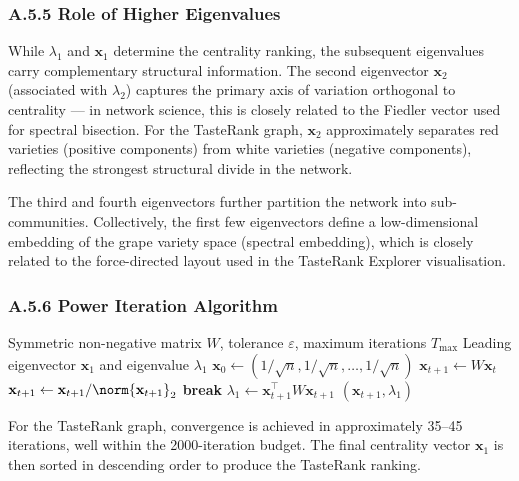 \documentclass[11pt]{article}
\begin{document}
\subsubsection*{A.5.5 Role of Higher Eigenvalues}
While $\lambda_1$ and $\mathbf{x}_1$ determine the centrality ranking, the subsequent eigenvalues carry complementary structural information. The second eigenvector $\mathbf{x}_2$ (associated with $\lambda_2$) captures the primary axis of variation orthogonal to centrality --- in network science, this is closely related to the Fiedler vector used for spectral bisection. For the TasteRank graph, $\mathbf{x}_2$ approximately separates red varieties (positive components) from white varieties (negative components), reflecting the strongest structural divide in the network.

The third and fourth eigenvectors further partition the network into sub-communities. Collectively, the first few eigenvectors define a low-dimensional embedding of the grape variety space (spectral embedding), which is closely related to the force-directed layout used in the TasteRank Explorer visualisation.

\subsubsection*{A.5.6 Power Iteration Algorithm}

\begin{algorithm}[H]
\caption{Power iteration for TasteRank}
\begin{algorithmic}[1]
\Require Symmetric non-negative matrix $W$, tolerance $\varepsilon$, maximum iterations $T_{\max}$
\Ensure Leading eigenvector $\mathbf{x}_1$ and eigenvalue $\lambda_1$
\State $\mathbf{x}_0 \gets (1/\sqrt{n}, 1/\sqrt{n}, \ldots, 1/\sqrt{n})$
  \State $\mathbf{x}_{t+1} \gets W \mathbf{x}_t$
  \State $\mathbf{x}_{t+1} \gets \mathbf{x}_{t+1} / \norm{\mathbf{x}_{t+1}}_2$
   \textbf{break} \EndIf
\EndFor
\State $\lambda_1 \gets \mathbf{x}_{t+1}^\top W \mathbf{x}_{t+1}$ 
\State \Return $(\mathbf{x}_{t+1}, \lambda_1)$
\end{algorithmic}
\end{algorithm}

For the TasteRank graph, convergence is achieved in approximately 35--45 iterations, well within the 2000-iteration budget. The final centrality vector $\mathbf{x}_1$ is then sorted in descending order to produce the TasteRank ranking.
\end{document}
